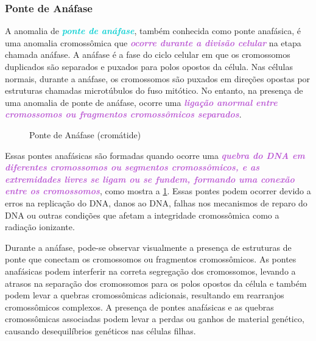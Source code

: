 \documentclass[11pt,a4paper]{article}
\begin{document}
\subsubsection*{Ponte de Anáfase}

	A anomalia de \textcolor{DarkTurquoise}{\textbf{\textit{ponte de anáfase}}}, também conhecida como ponte anafásica, é uma anomalia cromossômica que \textcolor{MediumOrchid}{\textbf{\textit{ocorre durante a divisão celular}}} na etapa chamada anáfase. A anáfase é a fase do ciclo celular em que os cromossomos duplicados são separados e puxados para polos opostos da célula. Nas células normais, durante a anáfase, os cromossomos são puxados em direções opostas por estruturas chamadas microtúbulos do fuso mitótico. No entanto, na presença de uma anomalia de ponte de anáfase, ocorre uma \textcolor{MediumOrchid}{\textbf{\textit{ligação anormal entre cromossomos ou fragmentos cromossômicos separados}}}.

	\begin{figure}
		\caption{Ponte de Anáfase (cromátide)}
		\label{fig:ponteDeAnafase}
	\end{figure}

	Essas pontes anafásicas são formadas quando ocorre uma \textcolor{MediumOrchid}{\textbf{\textit{quebra do DNA em diferentes cromossomos ou segmentos cromossômicos, e as extremidades livres se ligam ou se fundem, formando uma conexão entre os cromossomos}}}, como mostra a \ref{fig:ponteDeAnafase}. Essas pontes podem ocorrer devido a erros na replicação do DNA, danos ao DNA, falhas nos mecanismos de reparo do DNA ou outras condições que afetam a integridade cromossômica como a radiação ionizante.

	Durante a anáfase, pode-se observar visualmente a presença de estruturas de ponte que conectam os cromossomos ou fragmentos cromossômicos. As pontes anafásicas podem interferir na correta segregação dos cromossomos, levando a atrasos na separação dos cromossomos para os polos opostos da célula e também podem levar a quebras cromossômicas adicionais, resultando em rearranjos cromossômicos complexos. A presença de pontes anafásicas e as quebras cromossômicas associadas podem levar a perdas ou ganhos de material genético, causando desequilíbrios genéticos nas células filhas.
\end{document}
